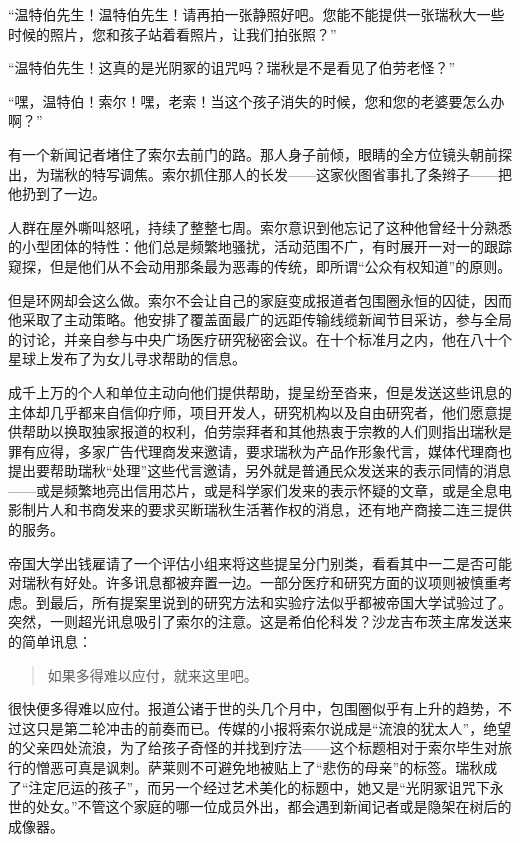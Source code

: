 \documentclass[AutoFakeBold=true]{book}
\begin{document}
``温特伯先生！温特伯先生！请再拍一张静照好吧。您能不能提供一张瑞秋大一些时候的照片，您和孩子站着看照片，让我们拍张照？''

``温特伯先生！这真的是光阴冢的诅咒吗？瑞秋是不是看见了伯劳老怪？''

``嘿，温特伯！索尔！嘿，老索！当这个孩子消失的时候，您和您的老婆要怎么办啊？''

有一个新闻记者堵住了索尔去前门的路。那人身子前倾，眼睛的全方位镜头朝前探出，为瑞秋的特写调焦。索尔抓住那人的长发——这家伙图省事扎了条辫子——把他扔到了一边。

人群在屋外嘶叫怒吼，持续了整整七周。索尔意识到他忘记了这种他曾经十分熟悉的小型团体的特性：他们总是频繁地骚扰，活动范围不广，有时展开一对一的跟踪窥探，但是他们从不会动用那条最为恶毒的传统，即所谓``公众有权知道''的原则。

但是环网却会这么做。索尔不会让自己的家庭变成报道者包围圈永恒的囚徒，因而他采取了主动策略。他安排了覆盖面最广的远距传输线缆新闻节目采访，参与全局的讨论，并亲自参与中央广场医疗研究秘密会议。在十个标准月之内，他在八十个星球上发布了为女儿寻求帮助的信息。

成千上万的个人和单位主动向他们提供帮助，提呈纷至沓来，但是发送这些讯息的主体却几乎都来自信仰疗师，项目开发人，研究机构以及自由研究者，他们愿意提供帮助以换取独家报道的权利，伯劳崇拜者和其他热衷于宗教的人们则指出瑞秋是罪有应得，多家广告代理商发来邀请，要求瑞秋为产品作形象代言，媒体代理商也提出要帮助瑞秋``处理''这些代言邀请，另外就是普通民众发送来的表示同情的消息——或是频繁地亮出信用芯片，或是科学家们发来的表示怀疑的文章，或是全息电影制片人和书商发来的要求买断瑞秋生活著作权的消息，还有地产商接二连三提供的服务。

帝国大学出钱雇请了一个评估小组来将这些提呈分门别类，看看其中一二是否可能对瑞秋有好处。许多讯息都被弃置一边。一部分医疗和研究方面的议项则被慎重考虑。到最后，所有提案里说到的研究方法和实验疗法似乎都被帝国大学试验过了。突然，一则超光讯息吸引了索尔的注意。这是希伯伦科发？沙龙吉布茨主席发送来的简单讯息：

\begin{quotation}
	\begin{center}{\heiti 如果多得难以应付，就来这里吧。}\end{center}
\end{quotation}

很快便多得难以应付。报道公诸于世的头几个月中，包围圈似乎有上升的趋势，不过这只是第二轮冲击的前奏而已。传媒的小报将索尔说成是``流浪的犹太人''，绝望的父亲四处流浪，为了给孩子奇怪的并找到疗法——这个标题相对于索尔毕生对旅行的憎恶可真是讽刺。萨莱则不可避免地被贴上了``悲伤的母亲''的标签。瑞秋成了``注定厄运的孩子''，而另一个经过艺术美化的标题中，她又是``光阴冢诅咒下永世的处女。''不管这个家庭的哪一位成员外出，都会遇到新闻记者或是隐架在树后的成像器。
\end{document}
